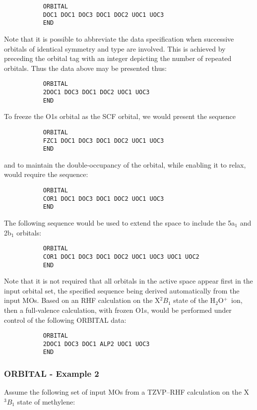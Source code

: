 \documentclass[11pt,fleqn]{article}
\newcommand{\waterp}{\mbox{H$_{2}$O$^{+}$}}
\begin{document}
{
\footnotesize
\begin{verbatim}
           ORBITAL
           DOC1 DOC1 DOC3 DOC1 DOC2 UOC1 UOC3
           END
\end{verbatim}
}
Note that it is possible to abbreviate the data specification when
successive orbitals of identical symmetry and type are involved.
This is achieved by preceding the orbital tag with an integer
depicting the number of repeated orbitals. Thus the data above
may be presented thus:

{
\footnotesize
\begin{verbatim}
           ORBITAL
           2DOC1 DOC3 DOC1 DOC2 UOC1 UOC3
           END
\end{verbatim}
}
To freeze the O1s orbital as the SCF orbital, 
we would present the sequence
{
\footnotesize
\begin{verbatim}
           ORBITAL
           FZC1 DOC1 DOC3 DOC1 DOC2 UOC1 UOC3
           END
\end{verbatim}
}
and to maintain the double-occupancy of the orbital, while
enabling it to relax, would require the sequence:

{
\footnotesize
\begin{verbatim}
           ORBITAL
           COR1 DOC1 DOC3 DOC1 DOC2 UOC1 UOC3
           END
\end{verbatim}
}
The following sequence would be used to extend the space to include
the 5a$_{1}$ and 2b$_{1}$ orbitals:
{
\footnotesize
\begin{verbatim}
           ORBITAL
           COR1 DOC1 DOC3 DOC1 DOC2 UOC1 UOC3 UOC1 UOC2
           END
\end{verbatim}
}
Note that it is not required that all orbitals in the active space 
appear first in the
input orbital set, the specified sequence being derived automatically
from the input MOs.
Based on an RHF calculation on the X$^{2}B_{1}$ state of the
\waterp\ ion, then a full-valence calculation, with frozen O1s, would
be performed under control of the following ORBITAL data:

{
\footnotesize
\begin{verbatim}
           ORBITAL
           2DOC1 DOC3 DOC1 ALP2 UOC1 UOC3
           END
\end{verbatim}
}

\subsubsection{ORBITAL - Example 2}
Assume the following set of input MOs from a TZVP--RHF
calculation on the X$^{3}B_{1}$ state of methylene:
\end{document}
